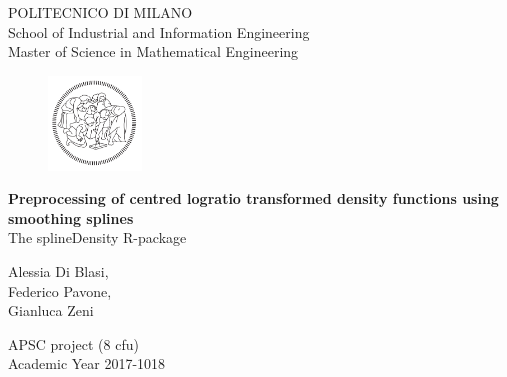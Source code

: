 \thispagestyle{empty}

\vspace*{-1.5cm} \bfseries{
\begin{center}
  \large
  POLITECNICO DI MILANO\\
  \normalsize
  School of Industrial and Information Engineering\\
  Master of Science in Mathematical Engineering\\
  \begin{figure}[htbp]
    \begin{center}
      \includegraphics[width=2.5cm]{./pictures/logopoli.png}
    \end{center}
  \end{figure}
  \vspace*{1.5cm} \LARGE



  \textbf{Preprocessing of centred logratio transformed density functions using smoothing splines}\\



  \vspace*{1.25truecm} \Large
  The splineDensity R-package \\
  
  \vspace*{3.75truecm} \large
  
    Alessia Di Blasi,\\
    Federico Pavone,\\
    Gianluca Zeni
  
  
  \vspace*{2.75cm} \large

  APSC project (8 cfu) \\

  \vspace*{1.0truecm} \large
  Academic Year 2017-1018
  
\end{center} 
}
